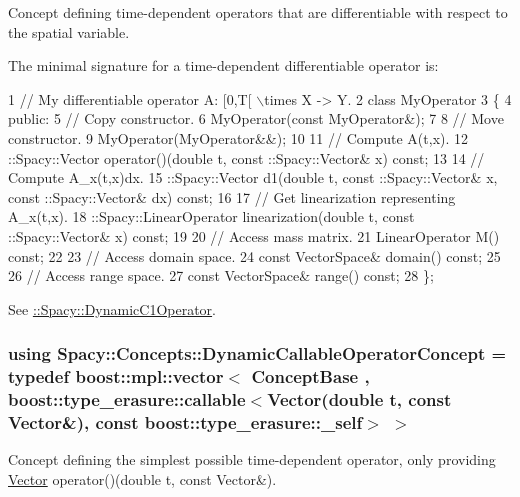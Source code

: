 Concept defining time-\/dependent operators that are differentiable with respect to the spatial variable. 

\label{group__ConceptGroup_gaa7ef0ce2d66b0610035541b580564b11_DynamicC1OperatorConceptAnchor}%
\hypertarget{group__ConceptGroup_gaa7ef0ce2d66b0610035541b580564b11_DynamicC1OperatorConceptAnchor}{}%
The minimal signature for a time-\/dependent differentiable operator is\+: 
\begin{DoxyCode}
1 // My differentiable operator A: [0,T[ \(\backslash\)times X -> Y.
2 class MyOperator
3 \{
4 public:
5   // Copy constructor.
6   MyOperator(const MyOperator&);
7 
8   // Move constructor.
9   MyOperator(MyOperator&&);
10 
11   // Compute A(t,x).
12   ::Spacy::Vector operator()(double t, const ::Spacy::Vector& x) const;
13 
14   // Compute A\_x(t,x)dx.
15   ::Spacy::Vector d1(double t, const ::Spacy::Vector& x, const ::Spacy::Vector& dx) const;
16 
17   // Get linearization representing A\_x(t,x).
18  ::Spacy::LinearOperator linearization(double t, const ::Spacy::Vector& x) const;
19 
20   // Access mass matrix.
21   LinearOperator M() const;
22 
23   // Access domain space.
24   const VectorSpace& domain() const;
25 
26   // Access range space.
27   const VectorSpace& range() const;
28 \};
\end{DoxyCode}


See \hyperlink{group__SpacyGroup_gabc9c830d2a7e020bcab097b10ee6f642_DynamicC1OperatorAnchor}{\+:\+:Spacy\+:\+:Dynamic\+C1\+Operator}. \hypertarget{group__ConceptGroup_ga30692db093ead5a1a074905363a2f043_ga30692db093ead5a1a074905363a2f043}{}
\subsubsection[{Dynamic\+Callable\+Operator\+Concept}]{\setlength{\rightskip}{0pt plus 5cm}using {\bf Spacy\+::\+Concepts\+::\+Dynamic\+Callable\+Operator\+Concept} = typedef boost\+::mpl\+::vector$<$ Concept\+Base , boost\+::type\+\_\+erasure\+::callable$<$Vector(double t, const Vector\&), const boost\+::type\+\_\+erasure\+::\+\_\+self$>$ $>$}\label{group__ConceptGroup_ga30692db093ead5a1a074905363a2f043_ga30692db093ead5a1a074905363a2f043}


Concept defining the simplest possible time-\/dependent operator, only providing \hyperlink{classSpacy_1_1Vector}{Vector} operator()(double t, const Vector\&). 


